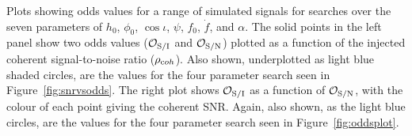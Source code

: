 \label{fig:snrvsodds_larger}
Plots showing odds values for a range of simulated signals for searches over the seven parameters of $h_0$, $\phi_0$,
$\cos{\iota}$, $\psi$, $f_0$, $\dot{f}$, and $\alpha$. The solid points in the left panel show two odds values
($\mathcal{O}_{\rm S/I}$ and $\mathcal{O}_{\rm S/N}$) plotted as a function of the injected coherent signal-to-noise ratio
($\rho_{\text coh}$). Also shown, underplotted as light blue shaded circles, are the values for the four parameter search seen in
Figure~\ref{fig:snrvsodds}. The right plot shows $\mathcal{O}_{\rm S/I}$ as a function of $\mathcal{O}_{\rm S/N}$, with
the colour of each point giving the coherent SNR. Again, also shown, as the light blue circles, are the values for the four
parameter search seen in Figure~\ref{fig:oddsplot}.
